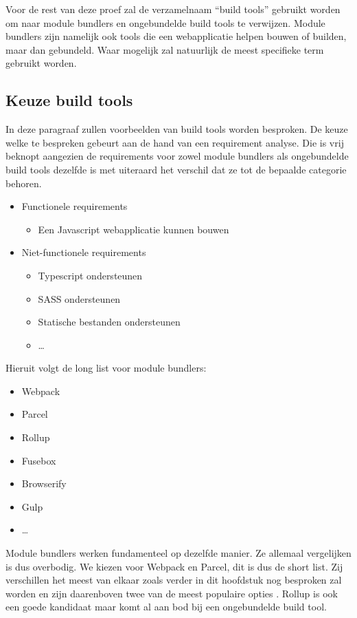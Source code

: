 Voor de rest van deze proef zal de verzamelnaam “build tools” gebruikt worden om naar module bundlers en ongebundelde build tools te verwijzen. Module bundlers zijn namelijk ook tools die een webapplicatie helpen bouwen of builden, maar dan gebundeld. Waar mogelijk zal natuurlijk de meest specifieke term gebruikt worden.

\subsection{Keuze build tools}

In deze paragraaf zullen voorbeelden van build tools worden besproken. De keuze welke te bespreken gebeurt aan de hand van een requirement analyse. Die is vrij beknopt aangezien de requirements voor zowel module bundlers als ongebundelde build tools dezelfde is met uiteraard het verschil dat ze tot de bepaalde categorie behoren.

\begin{itemize}
   \item Functionele requirements
   \begin{itemize}
     \item Een \gls{Javascript} webapplicatie kunnen bouwen
   \end{itemize}
   \item Niet-functionele requirements
   \begin{itemize}
     \item Typescript ondersteunen
     \item \gls{SASS} ondersteunen
     \item Statische bestanden ondersteunen
     \item …
   \end{itemize}
\end{itemize}

Hieruit volgt de long list voor module bundlers:
\begin{itemize}
\item Webpack
\item Parcel
\item Rollup
\item Fusebox
\item Browserify
\item Gulp
\item …
\end{itemize}

Module bundlers werken fundamenteel op dezelfde manier. Ze allemaal vergelijken is dus overbodig. We kiezen voor Webpack en Parcel, dit is dus de short list. Zij verschillen het meest van elkaar zoals verder in dit hoofdstuk nog besproken zal worden en zijn daarenboven twee van de meest populaire opties \autocite{stateofjs-2020}. Rollup is ook een goede kandidaat maar komt al aan bod bij een ongebundelde build tool.

